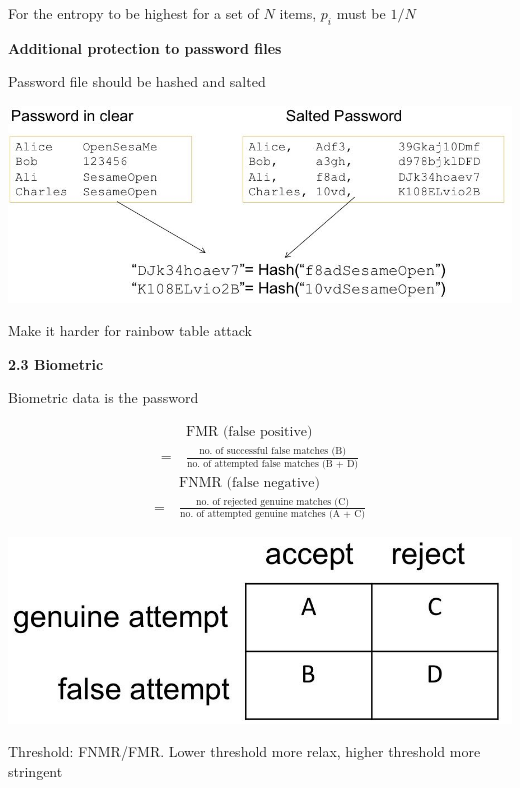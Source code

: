 \documentclass[landscape,a4paper]{extarticle}
\newenvironment{Figure}
  {\par\noindent\minipage{\linewidth}}
  {\endminipage\par\medskip}
\begin{document}
\begin{multicols*}{5}
    For the entropy to be highest for a set of $N$ items, $p_i$ must be $1/N$

    \textbf{Additional protection to password files}

    Password file should be hashed and salted
    \begin{Figure}
        \centering
        \includegraphics[width=\linewidth]{hashed_salted.jpg}        
    \end{Figure}

    Make it harder for rainbow table attack

    \textbf{2.3 Biometric}

    Biometric data is the password

    \begin{align*}
        &\text{FMR (false positive)}\\
       =\ &\frac{\text{no. of successful false matches (B)}}{\text{no. of attempted false matches (B + D)}}
    \end{align*}
    \vspace{1px}
    \begin{align*}
        &\text{FNMR (false negative)}\\
       =\ &\frac{\text{no. of rejected genuine matches (C)}}{\text{no. of attempted genuine matches (A + C)}}
    \end{align*}
    \begin{Figure}
        \centering
        \includegraphics[width=0.8\linewidth]{fmr_fnmr.jpg}        
    \end{Figure}
    Threshold: FNMR/FMR. Lower threshold more relax, higher threshold more stringent


\end{multicols*}
\end{document}
